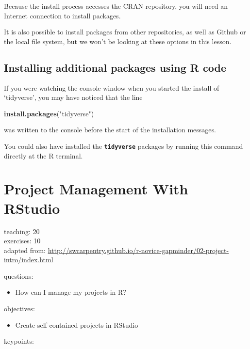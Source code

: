 \documentclass[]{book}
\newenvironment{Shaded}{\begin{snugshade}}{\end{snugshade}}
\newcommand{\KeywordTok}[1]{\textcolor[rgb]{0.13,0.29,0.53}{\textbf{#1}}}
\newcommand{\StringTok}[1]{\textcolor[rgb]{0.31,0.60,0.02}{#1}}
\newcommand{\NormalTok}[1]{#1}
\providecommand{\tightlist}{%
  \setlength{\itemsep}{0pt}\setlength{\parskip}{0pt}}
\begin{document}
Because the install process accesses the CRAN repository, you will need
an Internet connection to install packages.

It is also possible to install packages from other repositories, as well
as Github or the local file system, but we won't be looking at these
options in this lesson.

\section{Installing additional packages using R
code}\label{installing-additional-packages-using-r-code}

If you were watching the console window when you started the install of
`tidyverse', you may have noticed that the line

\begin{Shaded}
\begin{Highlighting}[]
\KeywordTok{install.packages}\NormalTok{(}\StringTok{"tidyverse"}\NormalTok{)}
\end{Highlighting}
\end{Shaded}

was written to the console before the start of the installation
messages.

You could also have installed the \textbf{\texttt{tidyverse}} packages
by running this command directly at the R terminal.

\chapter{Project Management With RStudio}\label{projectmanagement}

teaching: 20\\
exercises: 10\\
adapted from:
\url{http://swcarpentry.github.io/r-novice-gapminder/02-project-intro/index.html}

questions:

\begin{itemize}
\tightlist
\item
  How can I manage my projects in R?
\end{itemize}

objectives:

\begin{itemize}
\tightlist
\item
  Create self-contained projects in RStudio
\end{itemize}

keypoints:
\end{document}
